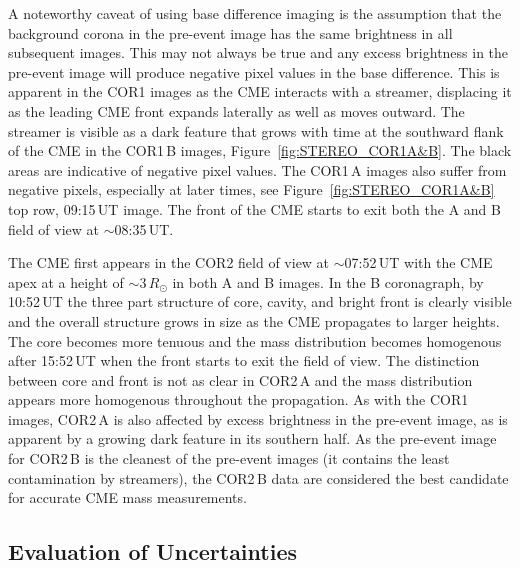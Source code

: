 A noteworthy caveat of using base difference imaging is the assumption that the background corona in the pre-event image has the same 
brightness in all subsequent images. This may not always be true and any excess brightness in the pre-event image will produce negative pixel 
values in the base difference. This is apparent in the COR1 images as the CME interacts with a streamer, displacing it as the leading CME front 
expands laterally as well as moves outward. The streamer is visible as a dark feature that grows with time at the southward flank of the CME in the 
COR1\,B images, Figure~\ref{fig:STEREO_COR1A&B}. The black areas are indicative of negative pixel values. 
The COR1\,A images also suffer from negative pixels, especially at later times, see Figure~\ref{fig:STEREO_COR1A&B} top row, 09:15\,UT image. 
The front of the CME starts to exit both the A and B field of view at $\sim$08:35\,UT.

The CME first appears in the COR2 field of view at $\sim$07:52\,UT with the CME apex at a height of $\sim$3\,$R_{\odot}$ in both A and B 
images. In the B coronagraph, by 10:52\,UT the three part structure of core, cavity, and bright front is clearly visible and the overall structure grows 
in size as the CME propagates to larger heights. The core becomes more tenuous and the mass distribution becomes homogenous after 15:52\,UT 
when the front starts to exit the field of view. The distinction between core and front is not as clear in COR2\,A and the mass distribution appears more 
homogenous throughout the propagation. As with the COR1 images, COR2\,A is also affected by excess brightness in the pre-event image, as is 
apparent by a growing dark feature in its southern half. As the pre-event image for COR2\,B is the cleanest of the pre-event images (it contains the 
least contamination by streamers), the COR2\,B data are considered the best candidate for accurate CME mass measurements. 




\subsection{Evaluation of Uncertainties}\label{sec:10}

